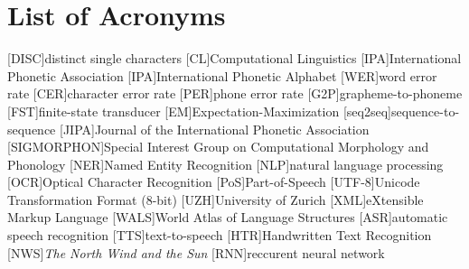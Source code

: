 {}
\chapter*{List of Acronyms}
\begin{acronym}[SIGMORPHON]\itemsep3pt
[DISC]{distinct single characters}
[CL]{Computational Linguistics}
[IPA]{International Phonetic Association}
[IPA]{International Phonetic Alphabet}
[WER]{word error rate}
[CER]{character error rate}
[PER]{phone error rate}
[G2P]{grapheme-to-phoneme}
[FST]{finite-state transducer}
[EM]{Expectation-Maximization}
[seq2seq]{sequence-to-sequence} 
[JIPA]{Journal of the International Phonetic Association}
[SIGMORPHON]{Special Interest Group on Computational  Morphology and Phonology}
[NER]{Named Entity Recognition}
[NLP]{natural language processing}
[OCR]{Optical Character Recognition}
[PoS]{Part-of-Speech}
[UTF-8]{Unicode Transformation Format (8-bit)}
[UZH]{University of Zurich}
[XML]{eXtensible Markup Language}
[WALS]{World Atlas of Language Structures}
[ASR]{automatic speech recognition}
[TTS]{text-to-speech}
[HTR]{Handwritten Text Recognition}
[NWS]{\textit{The North Wind and the Sun}}
[RNN]{reccurent neural network}
\end{acronym}